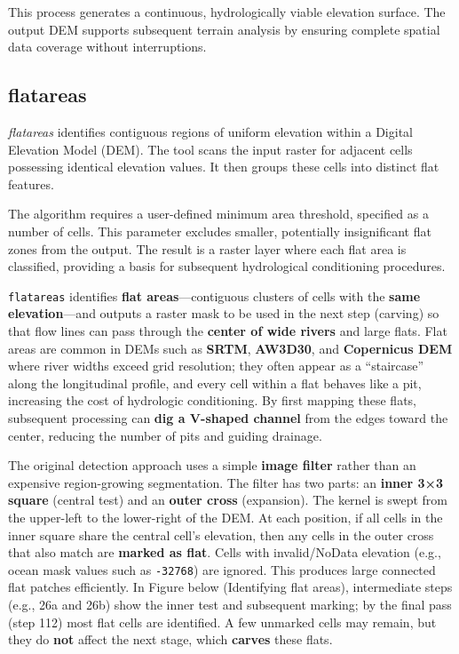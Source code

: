 \documentclass[
]{book}
\theoremstyle{definition}
\theoremstyle{definition}
\theoremstyle{definition}
\theoremstyle{definition}
\theoremstyle{remark}
\begin{document}
This process generates a continuous, hydrologically viable elevation surface. The output DEM supports subsequent terrain analysis by ensuring complete spatial data coverage without interruptions.

\subsection{flatareas}\label{flatareas}

\emph{flatareas} identifies contiguous regions of uniform elevation within a Digital Elevation Model (DEM). The tool scans the input raster for adjacent cells possessing identical elevation values. It then groups these cells into distinct flat features.

The algorithm requires a user-defined minimum area threshold, specified as a number of cells. This parameter excludes smaller, potentially insignificant flat zones from the output. The result is a raster layer where each flat area is classified, providing a basis for subsequent hydrological conditioning procedures.

\texttt{flatareas} identifies \textbf{flat areas}---contiguous clusters of cells with the \textbf{same elevation}---and outputs a raster mask to be used in the next step (carving) so that flow lines can pass through the \textbf{center of wide rivers} and large flats. Flat areas are common in DEMs such as \textbf{SRTM}, \textbf{AW3D30}, and \textbf{Copernicus DEM} where river widths exceed grid resolution; they often appear as a ``staircase'' along the longitudinal profile, and every cell within a flat behaves like a pit, increasing the cost of hydrologic conditioning. By first mapping these flats, subsequent processing can \textbf{dig a V-shaped channel} from the edges toward the center, reducing the number of pits and guiding drainage.

The original detection approach uses a simple \textbf{image filter} rather than an expensive region-growing segmentation. The filter has two parts: an \textbf{inner 3×3 square} (central test) and an \textbf{outer cross} (expansion). The kernel is swept from the upper-left to the lower-right of the DEM. At each position, if all cells in the inner square share the central cell's elevation, then any cells in the outer cross that also match are \textbf{marked as flat}. Cells with invalid/NoData elevation (e.g., ocean mask values such as \texttt{-32768}) are ignored. This produces large connected flat patches efficiently. In Figure below (Identifying flat areas), intermediate steps (e.g., 26a and 26b) show the inner test and subsequent marking; by the final pass (step 112) most flat cells are identified. A few unmarked cells may remain, but they do \textbf{not} affect the next stage, which \textbf{carves} these flats.
\end{document}
